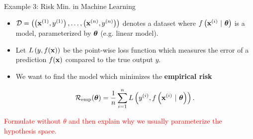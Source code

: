 \begin{frame}{Example 3: Risk Min. in Machine Learning}
	
	
\begin{itemize}
	\item $\mathcal{D} = \left( \left(\mathbf{x}^{(1)}, y^{(1)}\right), \ldots, \left(\mathbf{x}^{(n)}, y^{(n)}\right)\right)$ denotes a dataset 
	where $f\left(\mathbf{x}^{(i)} ~|~ \bm{\theta}\right)$ is a model, parameterized by $\bm{\theta}$ (e.g. linear model).
	\item Let $L\left(y, f(\mathbf{x})\right)$ be the point-wise loss function which measures the error of a prediction $f(\mathbf{x})$ compared to the true output $y$.
	\item We want to find the model which minimizes the \textbf{empirical risk}
	
	$$
	\mathcal{R}_{\text{emp}}(\bm{\theta}) = \frac{1}{n} \sum\limits_{i=1}^n L\left(y^{(i)}, f\left(\mathbf{x}^{(i)} ~|~ \bm{\theta}\right)\right).
	$$
\end{itemize}

\textcolor{red}{Formulate without $\theta$ and then explain why we usually parameterize the hypothesis space. }

\end{frame}	

